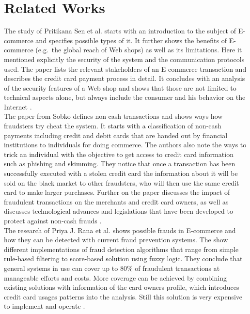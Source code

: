 
\chapter{Related Works}
\label{cha:related_works}

The study of Pritikana Sen et al. starts with an introduction to the subject of \gls{E-commerce} and specifies possible types of it. It further shows the benefits of \gls{E-commerce} (e.g.\ the global reach of Web shops) as well as its limitations. Here it mentioned explicitly the security of the system and the communication protocols used. The paper lists the relevant stakeholders of an \gls{E-commerce} transaction and describes the credit card payment process in detail. It concludes with an analysis of the security features of a Web shop and shows that those are not limited to technical aspects alone, but always include the consumer and his behavior on the Internet \citep{sen2015study}. \\

The paper from Sobko defines non-cash transactions and shows ways how fraudsters try cheat the system. It starts with a classification of non-cash payments including credit and debit cards that are handed out by financial institutions to individuals for doing commerce. The authors also note the ways to trick an individual with the objective to get access to credit card information such as phishing and skimming. They notice that once a transaction has been successfully executed with a stolen credit card the information about it will be sold on the black market to other fraudsters, who will then use the same credit card to make larger purchases. Further on the paper discusses the impact of fraudulent transactions on the merchants and credit card owners, as well as discusses technological advances and legislations that have been developed to protect against non-cash frauds \citep{sobko2014fraud}. \\

The research of Priya J. Rana et al. shows possible frauds in \gls{E-commerce} and how they can be detected with current fraud prevention systems. The show different implementations of fraud detection algorithms that range from simple rule-based filtering to score-based solution using fuzzy logic. They conclude that general systems in use can cover up to 80\% of fraudulent transactions at manageable efforts and costs. More coverage can be achieved by combining existing solutions with information of the card owners profile, which introduces credit card usages patterns into the analysis. Still this solution is very expensive to implement and operate \citep{rana2015survey}. \\

